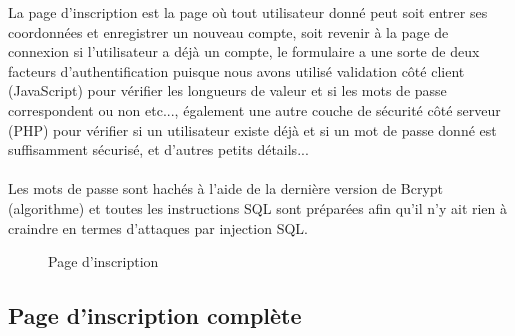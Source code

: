 \documentclass[12pt]{report}
\begin{document}
La page d'inscription est la page où tout utilisateur donné peut soit entrer ses coordonnées et enregistrer un nouveau compte, soit revenir à la page de connexion si l'utilisateur a déjà un compte, le formulaire a une sorte de deux facteurs d'authentification puisque nous avons utilisé validation côté client (JavaScript) pour vérifier les longueurs de valeur et si les mots de passe correspondent ou non etc..., également une autre couche de sécurité côté serveur (PHP) pour vérifier si un utilisateur existe déjà et si un mot de passe donné est suffisamment sécurisé, et d'autres petits détails...
\\\\
Les mots de passe sont hachés à l'aide de la dernière version de Bcrypt (algorithme) et toutes les instructions SQL sont préparées afin qu'il n'y ait rien à craindre en termes d'attaques par injection SQL.

\vspace{0.8in}

\begin{figure}[h]
\centering
\caption{Page d'inscription}
\end{figure}

\newpage

\subsection{Page d'inscription complète}
\end{document}

